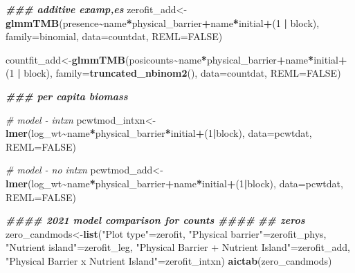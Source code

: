 \documentclass[
]{article}
\newenvironment{Shaded}{\begin{snugshade}}{\end{snugshade}}
\newcommand{\AttributeTok}[1]{\textcolor[rgb]{0.13,0.29,0.53}{#1}}
\newcommand{\CommentTok}[1]{\textcolor[rgb]{0.56,0.35,0.01}{\textit{#1}}}
\newcommand{\ConstantTok}[1]{\textcolor[rgb]{0.56,0.35,0.01}{#1}}
\newcommand{\DecValTok}[1]{\textcolor[rgb]{0.00,0.00,0.81}{#1}}
\newcommand{\DocumentationTok}[1]{\textcolor[rgb]{0.56,0.35,0.01}{\textbf{\textit{#1}}}}
\newcommand{\FunctionTok}[1]{\textcolor[rgb]{0.13,0.29,0.53}{\textbf{#1}}}
\newcommand{\NormalTok}[1]{#1}
\newcommand{\OtherTok}[1]{\textcolor[rgb]{0.56,0.35,0.01}{#1}}
\newcommand{\SpecialCharTok}[1]{\textcolor[rgb]{0.81,0.36,0.00}{\textbf{#1}}}
\newcommand{\StringTok}[1]{\textcolor[rgb]{0.31,0.60,0.02}{#1}}
\begin{document}
\begin{Shaded}
\begin{Highlighting}[]
\DocumentationTok{\#\#\# additive examp,es}
\NormalTok{zerofit\_add}\OtherTok{\textless{}{-}}\FunctionTok{glmmTMB}\NormalTok{(presence}\SpecialCharTok{\textasciitilde{}}\NormalTok{name}\SpecialCharTok{*}\NormalTok{physical\_barrier}\SpecialCharTok{+}\NormalTok{name}\SpecialCharTok{*}\NormalTok{initial}\SpecialCharTok{+}\NormalTok{(}\DecValTok{1} \SpecialCharTok{|}\NormalTok{ block), }\AttributeTok{family=}\NormalTok{binomial, }\AttributeTok{data=}\NormalTok{countdat, }\AttributeTok{REML=}\ConstantTok{FALSE}\NormalTok{)}

\NormalTok{countfit\_add}\OtherTok{\textless{}{-}}\FunctionTok{glmmTMB}\NormalTok{(posicounts}\SpecialCharTok{\textasciitilde{}}\NormalTok{name}\SpecialCharTok{*}\NormalTok{physical\_barrier}\SpecialCharTok{+}\NormalTok{name}\SpecialCharTok{*}\NormalTok{initial}\SpecialCharTok{+}\NormalTok{(}\DecValTok{1} \SpecialCharTok{|}\NormalTok{ block), }\AttributeTok{family=}\FunctionTok{truncated\_nbinom2}\NormalTok{(), }\AttributeTok{data=}\NormalTok{countdat, }\AttributeTok{REML=}\ConstantTok{FALSE}\NormalTok{)}

\DocumentationTok{\#\#\# per capita biomass }

\CommentTok{\# model {-} intxn}
\NormalTok{pcwtmod\_intxn}\OtherTok{\textless{}{-}}\FunctionTok{lmer}\NormalTok{(log\_wt}\SpecialCharTok{\textasciitilde{}}\NormalTok{name}\SpecialCharTok{*}\NormalTok{physical\_barrier}\SpecialCharTok{*}\NormalTok{initial}\SpecialCharTok{+}\NormalTok{(}\DecValTok{1}\SpecialCharTok{|}\NormalTok{block), }\AttributeTok{data=}\NormalTok{pcwtdat, }\AttributeTok{REML=}\ConstantTok{FALSE}\NormalTok{)}

\CommentTok{\# model {-} no intxn}
\NormalTok{pcwtmod\_add}\OtherTok{\textless{}{-}}\FunctionTok{lmer}\NormalTok{(log\_wt}\SpecialCharTok{\textasciitilde{}}\NormalTok{name}\SpecialCharTok{*}\NormalTok{physical\_barrier}\SpecialCharTok{+}\NormalTok{name}\SpecialCharTok{*}\NormalTok{initial}\SpecialCharTok{+}\NormalTok{(}\DecValTok{1}\SpecialCharTok{|}\NormalTok{block), }\AttributeTok{data=}\NormalTok{pcwtdat, }\AttributeTok{REML=}\ConstantTok{FALSE}\NormalTok{)}


\DocumentationTok{\#\#\#\# 2021 model comparison for counts \#\#\#\# }
\DocumentationTok{\#\# zeros }
\NormalTok{zero\_candmods}\OtherTok{\textless{}{-}}\FunctionTok{list}\NormalTok{(}\StringTok{"Plot type"}\OtherTok{=}\NormalTok{zerofit, }
                    \StringTok{"Physical barrier"}\OtherTok{=}\NormalTok{zerofit\_phys,}
                    \StringTok{"Nutrient island"}\OtherTok{=}\NormalTok{zerofit\_leg,}
                    \StringTok{"Physical Barrier + Nutrient Island"}\OtherTok{=}\NormalTok{zerofit\_add,}
                    \StringTok{"Physical Barrier x Nutrient Island"}\OtherTok{=}\NormalTok{zerofit\_intxn)}
\FunctionTok{aictab}\NormalTok{(zero\_candmods) }
\end{Highlighting}
\end{Shaded}
\end{document}
